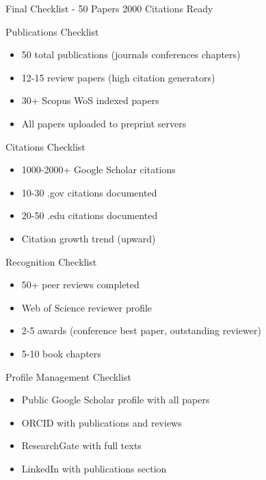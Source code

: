 \documentclass[11pt]{beamer}
\begin{document}
	\begin{frame}{Final Checklist - 50 Papers   2000 Citations Ready}
		\scriptsize
		\begin{block}{Publications Checklist}
			\begin{itemize}
				\item [$\square$] 50 total publications (journals  conferences chapters)
				\item [$\square$] 12-15 review papers (high citation generators)
				\item [$\square$] 30+ Scopus WoS indexed papers
				\item [$\square$] All papers uploaded to preprint servers
			\end{itemize}
		\end{block}
		\begin{block}{Citations Checklist}
			\begin{itemize}
				\item [$\square$] 1000-2000+ Google Scholar citations
				\item [$\square$] 10-30 .gov citations documented
				\item [$\square$] 20-50 .edu citations documented
				\item [$\square$] Citation growth trend (upward)
			\end{itemize}
		\end{block}
		\begin{block}{Recognition Checklist}
			\begin{itemize}
				\item [$\square$] 50+ peer reviews completed
				\item [$\square$] Web of Science reviewer profile
				\item [$\square$] 2-5 awards (conference best paper, outstanding reviewer)
				\item [$\square$] 5-10 book chapters
			\end{itemize}
		\end{block}
		\begin{block}{Profile Management Checklist}
			\begin{itemize}
				\item [$\square$] Public Google Scholar profile with all papers
				\item [$\square$] ORCID with publications and reviews
				\item [$\square$] ResearchGate with full texts
				\item [$\square$] LinkedIn with publications section
			\end{itemize}
		\end{block}
	\end{frame}
	
\end{document}
